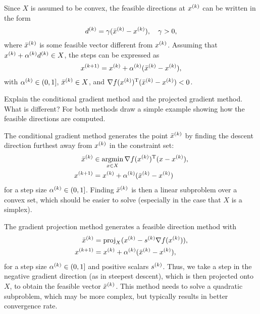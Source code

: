\documentclass{article}
\begin{document}
Since \(X\) is assumed to be convex, the feasible directions at \(\kth{x}\) can be written in the
form
\begin{equation*}
  \kth{d} = \gamma(\kth{\bar{x}} - \kth{x}), \quad \gamma > 0,
\end{equation*}
where \(\kth{\bar{x}}\) is some feasible vector different from \(\kth{x}\).  Assuming that
\(\kth{x} + \kth{\alpha} \kth{d} \in X\), the steps can be expressed as
\begin{equation*}
  \kth[k+1]{x} = \kth{x} + \kth{\alpha}(\kth{\bar{x}} - \kth{x}),
\end{equation*}
with \(\kth{\alpha} \in (0, 1]\), \(\kth{\bar{x}} \in X\), and
\(\T{\nabla f(\kth{x})}(\kth{\bar{x}} - \kth{x}) < 0\).

\begin{question}
  Explain the conditional gradient method and the projected gradient method.  What is different? For
  both methods draw a simple example showing how the feasible directions are computed.
\end{question}

The conditional gradient method generates the point \(\kth{\bar{x}}\) by finding the descent
direction furthest away from \(\kth{x}\) in the constraint set:
\begin{align*}
  \kth{\bar{x}} &\in \argmin_{x \in X} \T{\nabla f(\kth{x})}(x - \kth{x}), \\
  \kth[k+1]{x} &= \kth{x} + \kth{\alpha}(\kth{\bar{x}} - \kth{x})
\end{align*}
for a step size \(\kth{\alpha} \in (0, 1]\).  Finding \(\kth{\bar{x}}\) is then a linear subproblem over a convex set, which should be easier to
solve (especially in the case that \(X\) is a simplex).

The gradient projection method generates a feasible direction method with
\begin{align*}
  \kth{\bar{x}} &= \proj_X (\kth{x} - \kth{s} \nabla f(\kth{x})), \\
  \kth[k+1]{x} &= \kth{x} + \kth{\alpha}(\kth{\bar{x}} - \kth{x}),
\end{align*}
for a step size \(\kth{\alpha} \in (0, 1]\) and positive scalars \(\kth{s}\).  Thus, we take a step
in the negative gradient direction (as in steepest descent), which is then projected onto \(X\), to
obtain the feasible vector \(\kth{\bar{x}}\).  This method needs to solve a quadratic subproblem,
which may be more complex, but typically results in better convergence rate.
\end{document}
